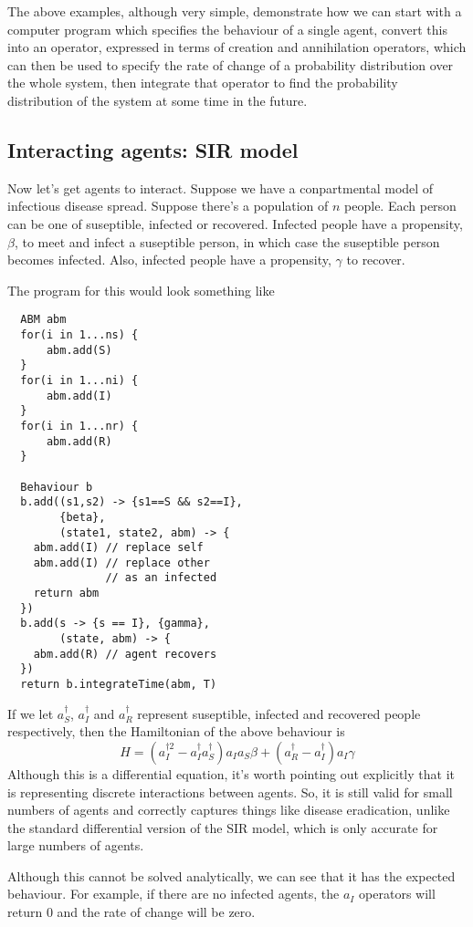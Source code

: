 \documentclass[letterpaper,twocolumn,10pt]{article}
\begin{document}
The above examples, although very simple, demonstrate how we can start with a computer program which specifies the behaviour of a single agent, convert this into an operator, expressed in terms of creation and annihilation operators, which can then be used to specify the rate of change of a probability distribution over the whole system, then integrate that operator to find the probability distribution of the system at some time in the future.

\subsection{Interacting agents: SIR model}

Now let's get agents to interact. Suppose we have a conpartmental model of infectious disease spread. Suppose there's a population of $n$ people. Each person can be one of suseptible, infected or recovered. Infected people have a propensity, $\beta$, to meet and infect a suseptible person, in which case the suseptible person becomes infected. Also, infected people have a propensity, $\gamma$ to recover.

The program for this would look something like
\begin{lstlisting}
  ABM abm
  for(i in 1...ns) {
	  abm.add(S)
  }
  for(i in 1...ni) {
	  abm.add(I)
  }
  for(i in 1...nr) {
	  abm.add(R)
  }
  
  Behaviour b
  b.add((s1,s2) -> {s1==S && s2==I}, 
        {beta},
        (state1, state2, abm) -> {
  	abm.add(I) // replace self
  	abm.add(I) // replace other
  	           // as an infected
    return abm
  })
  b.add(s -> {s == I}, {gamma},
        (state, abm) -> {
    abm.add(R) // agent recovers
  })
  return b.integrateTime(abm, T)
\end{lstlisting}

If we let $a^\dag_S$, $a^\dag_I$ and $a^\dag_R$ represent suseptible, infected and recovered people respectively, then the Hamiltonian of the above behaviour is
\[
H = (a_I^{\dag 2} - a_I^\dag a_S^\dag)a_I a_S\beta + (a_R^\dag - a_I^\dag)a_I\gamma
\]
Although this is a differential equation, it's worth pointing out explicitly that it is representing discrete interactions between agents. So, it is still valid for small numbers of agents and correctly captures things like disease eradication, unlike the standard differential version of the SIR model, which is only accurate for large numbers of agents.

Although this cannot be solved analytically, we can see that it has the expected behaviour. For example, if there are no infected agents, the $a_I$ operators will return $0$ and the rate of change will be zero.
\end{document}
